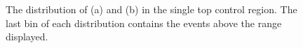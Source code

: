 \begin{figure}
  \caption{The distribution of \jetmetdphileading (a) and \Mjj (b) in the single top control region. The last bin of each distribution contains the events above the range displayed.}
  \label{fig:parkedsingletopjetmetdphi}
\end{figure}

